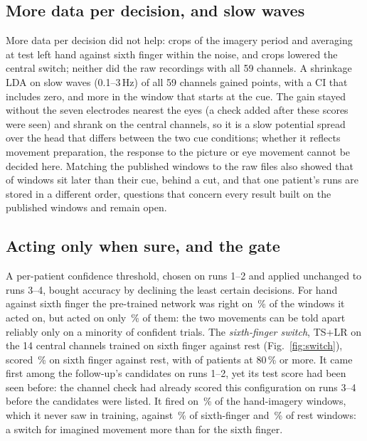 \subsection{More data per decision, and slow waves}
More data per decision did not help: crops of the imagery period and averaging at test left hand
against sixth finger within the noise, and crops lowered the central switch; neither did the raw
recordings with all 59 channels. A shrinkage LDA on slow waves (0.1--3\,Hz) of all 59 channels
gained \exTwoSlowFiftyNineVsBaseDiff{} points, with a CI that includes zero, and more in the
window that starts at the cue. The gain stayed without the seven electrodes nearest the eyes (a
check added after these scores were seen) and shrank on the central channels, so it is a slow
potential spread over the head that differs between the two cue conditions; whether it reflects
movement preparation, the response to the picture or eye movement cannot be decided here.
Matching the published windows to the raw files also showed that \exTwoAlignShifted{} of
\exTwoAlignWindows{} windows sit later than their cue, behind a cut, and that one patient's runs
are stored in a different order, questions that concern every result built on the published
windows and remain open.

\subsection{Acting only when sure, and the gate}
A per-patient confidence threshold, chosen on runs 1--2 and applied unchanged to runs 3--4,
bought accuracy by declining the least certain decisions. For hand against sixth finger the
pre-trained network was right on \exFourAhSfEegnetEaFtSureMean\,\% of the windows it acted on,
but acted on only \exFourAhSfEegnetEaFtSureShare\,\% of them: the two movements can be told apart
reliably only on a minority of confident trials. The \emph{sixth-finger switch}, TS+LR on the 14 central
channels trained on sixth finger against rest (Fig.~\ref{fig:switch}), scored \exFourTsLrCentralMean\,\% on sixth finger against rest, with
\exFourTsLrCentralNAtLeastEighty{} of \rqFourCueN{} patients at 80\,\% or more. It came first
among the follow-up's candidates on runs 1--2, yet its test score had been seen before: the
channel check had already scored this configuration on runs 3--4 before the candidates were
listed. It fired on \exFourTsLrCentralFiresAhMean\,\% of the hand-imagery windows, which it never
saw in training, against \exFourTsLrCentralFiresSfMean\,\% of sixth-finger and
\exFourTsLrCentralFiresRestMean\,\% of rest windows: a switch for imagined movement more than for
the sixth finger.


